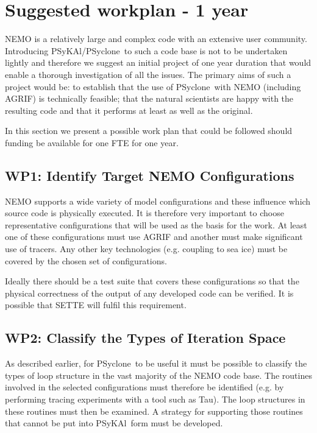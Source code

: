 \documentclass{article}
\newcommand{\psykal}{{PS}y{KA}l}
\newcommand{\psyclone}{{PS}yclone}
\begin{document}
\section{Suggested workplan - 1 year}

NEMO is a relatively large and complex code with an extensive user
community. Introducing \psykal/\psyclone\ to such a code base is not to
be undertaken lightly and therefore we suggest an initial project of
one year duration that would enable a thorough investigation of all
the issues. The primary aims of such a project would be: to establish
that the use of \psyclone\ with NEMO (including AGRIF) is technically
feasible; that the natural scientists are happy with the resulting
code and that it performs at least as well as the original.

In this section we present a possible work plan that could be followed
should funding be available for one FTE for one year.

\subsection{WP1: Identify Target NEMO Configurations}
\label{wp1_target_configs}

NEMO supports a wide variety of model configurations and these
influence which source code is physically executed. It is therefore
very important to choose representative configurations that will be
used as the basis for the work. At least one of these configurations
must use AGRIF and another must make significant use of tracers.  Any
other key technologies (e.g. coupling to sea ice) must be covered by
the chosen set of configurations.

Ideally there should be a test suite that covers these configurations
so that the physical correctness of the output of any developed code
can be verified. It is possible that SETTE will fulfil this
requirement.

\subsection{WP2: Classify the Types of Iteration Space}
\label{wp2_classify}

As described earlier, for \psyclone\ to be useful it must be possible to
classify the types of loop structure in the vast majority of the NEMO
code base. The routines involved in the selected configurations must
therefore be identified (e.g. by performing tracing experiments with a
tool such as Tau). The loop structures in these routines must then be
examined. A strategy for supporting those routines that cannot be put
into \psykal\ form must be developed.
\end{document}
